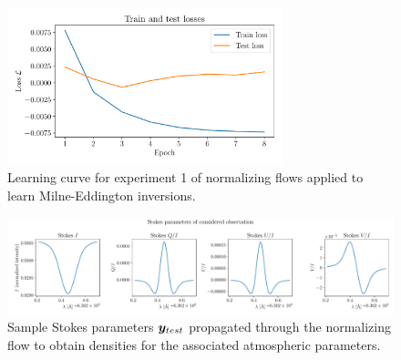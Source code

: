 \documentclass[a4paper,12pt]{report}
\begin{document}
\begin{figure}[h!]
\centering
\includegraphics[width=8cm]{figures/nf-milne-eddington-example-3-loss-nflows-piecewisequadratic.pdf}
\caption{Learning curve for experiment 1 of normalizing flows applied to learn Milne-Eddington inversions.}
\label{fig:nf-milne-eddington-example-3-loss-nflows-piecewisequadratic}
\end{figure}

\begin{figure}[h!]
\centering
\includegraphics[width=\textwidth]{figures/nf-milne-eddington-example-3-corner-spectrum-nf-nflows-piecewisequadratic.pdf}
\caption{Sample Stokes parameters $\bm{y}_{test}$ propagated through the normalizing flow to obtain densities for the associated atmospheric parameters.}
\label{fig:nf-milne-eddington-example-3-corner-spectrum-nf-nflows-piecewisequadratic}
\end{figure}
\end{document}
